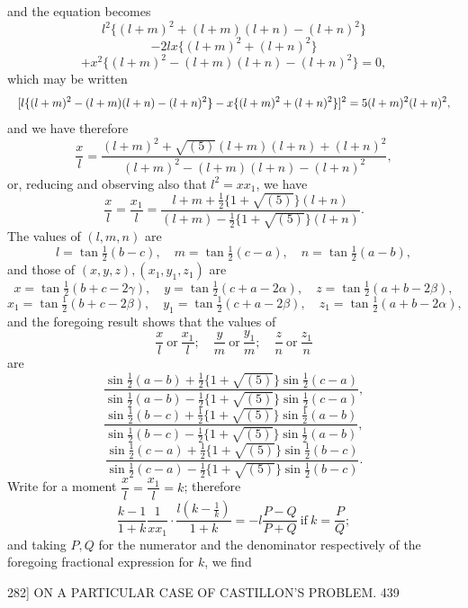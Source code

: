 \documentclass[11pt]{article}
\begin{document}
and the equation becomes
\[ l^{2}\{(l+m)^{2}+(l+m)(l+n)-(l+n)^{2}\} \]
\[ -2lx\{(l+m)^{2}+(l+n)^{2}\} \]
\[ +x^{2}\{(l+m)^{2}-(l+m)(l+n)-(l+n)^{2}\}=0, \]
which may be written
\[ \resizebox{\textwidth}{!}{$\displaystyle
[l\{(l+m)^{2}-(l+m)(l+n)-(l+n)^{2}\}-x\{(l+m)^{2}+(l+n)^{2}\}]^{2}
=5(l+m)^{2}(l+n)^{2},
$} \]
and we have therefore
\[ \dfrac{x}{l}=\dfrac{(l+m)^{2}+\sqrt{(5)}(l+m)(l+n)+(l+n)^{2}}{(l+m)^{2}-(l+m)(l+n)-(l+n)^{2}}, \]
or, reducing and observing also that $l^{2}=xx_{1}$, we have
\[ \dfrac{x}{l}=\dfrac{x_{1}}{l}=\dfrac{l+m+\tfrac{1}{2}\{1+\sqrt{(5)}\}(l+n)}{(l+m)-\tfrac{1}{2}\{1+\sqrt{(5)}\}(l+n)}. \]
The values of $(l,m,n)$ are
\[ l=\tan\tfrac{1}{2}(b-c),\quad m=\tan\tfrac{1}{2}(c-a),\quad n=\tan\tfrac{1}{2}(a-b), \]
and those of $(x,y,z),(x_{1},y_{1},z_{1})$ are
\[ x=\tan\tfrac{1}{2}(b+c-2\gamma),\quad y=\tan\tfrac{1}{2}(c+a-2\alpha),\quad z=\tan\tfrac{1}{2}(a+b-2\beta), \]
\[ x_{1}=\tan\tfrac{1}{2}(b+c-2\beta),\quad y_{1}=\tan\tfrac{1}{2}(c+a-2\beta),\quad z_{1}=\tan\tfrac{1}{2}(a+b-2\alpha), \]
and the foregoing result shows that the values of
\[ \dfrac{x}{l}\ \text{or}\ \dfrac{x_{1}}{l};\quad \dfrac{y}{m}\ \text{or}\ \dfrac{y_{1}}{m};\quad \dfrac{z}{n}\ \text{or}\ \dfrac{z_{1}}{n} \]
are
\[ \dfrac{\sin\tfrac{1}{2}(a-b)+\tfrac{1}{2}\{1+\sqrt{(5)}\}\sin\tfrac{1}{2}(c-a)}{\sin\tfrac{1}{2}(a-b)-\tfrac{1}{2}\{1+\sqrt{(5)}\}\sin\tfrac{1}{2}(c-a)}, \]
\[ \dfrac{\sin\tfrac{1}{2}(b-c)+\tfrac{1}{2}\{1+\sqrt{(5)}\}\sin\tfrac{1}{2}(a-b)}{\sin\tfrac{1}{2}(b-c)-\tfrac{1}{2}\{1+\sqrt{(5)}\}\sin\tfrac{1}{2}(a-b)}, \]
\[ \dfrac{\sin\tfrac{1}{2}(c-a)+\tfrac{1}{2}\{1+\sqrt{(5)}\}\sin\tfrac{1}{2}(b-c)}{\sin\tfrac{1}{2}(c-a)-\tfrac{1}{2}\{1+\sqrt{(5)}\}\sin\tfrac{1}{2}(b-c)}. \]
Write for a moment $\dfrac{x}{l}=\dfrac{x_{1}}{l}=k$; therefore
\[ \dfrac{k-1}{1+k}\dfrac{1}{xx_{1}}\cdot\dfrac{l(k-\tfrac{1}{k})}{1+k}=-l\dfrac{P-Q}{P+Q}\ \text{if}\ k=\dfrac{P}{Q}; \]
and taking $P,Q$ for the numerator and the denominator respectively of the foregoing
fractional expression for $k$, we find

\begin{center}
\textsc{282]} \hfill ON A PARTICULAR CASE OF CASTILLON'S PROBLEM. \hfill 439
\end{center}
\end{document}
